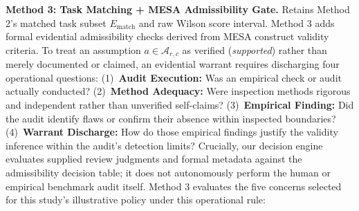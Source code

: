 \documentclass[runningheads]{llncs}
\begin{document}
\textbf{Method 3: Task Matching + MESA Admissibility Gate.} Retains Method 2's matched task subset $E_{\text{match}}$ and raw Wilson score interval. Method 3 adds formal evidential admissibility checks derived from MESA construct validity criteria. To treat an assumption $a \in \mathcal{A}_{r,c}$ as verified (\emph{supported}) rather than merely documented or claimed, an evidential warrant requires discharging four operational questions: (1)~\textbf{Audit Execution:} Was an empirical check or audit actually conducted? (2)~\textbf{Method Adequacy:} Were inspection methods rigorous and independent rather than unverified self-claims? (3)~\textbf{Empirical Finding:} Did the audit identify flaws or confirm their absence within inspected boundaries? (4)~\textbf{Warrant Discharge:} How do those empirical findings justify the validity inference within the audit's detection limits? Crucially, our decision engine evaluates supplied review judgments and formal metadata against the admissibility decision table; it does not autonomously perform the human or empirical benchmark audit itself. Method 3 evaluates the five concerns selected for this study's illustrative policy under this operational rule:
\end{document}
